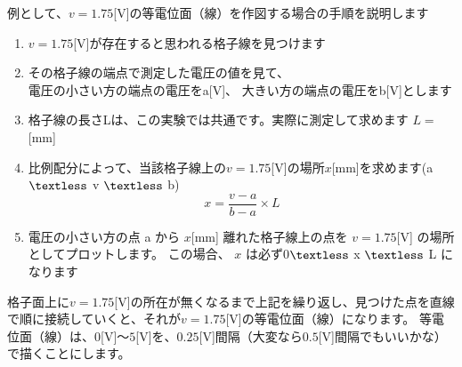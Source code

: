 \documentclass[uplatex,a4paper,11pt,oneside,openany]{jsbook}
\begin{document}
例として、$v=1.75$[V]の等電位面（線）を作図する場合の手順を説明します

\begin{enumerate}
  \item $v=1.75$[V]が存在すると思われる格子線を見つけます
  \item その格子線の端点で測定した電圧の値を見て、\\
  電圧の小さい方の端点の電圧をa[V]、
  大きい方の端点の電圧をb[V]とします
  \item 格子線の長さLは、この実験では共通です。実際に測定して求めます $L=$　　　[mm]
  \item 比例配分によって、当該格子線上の$v=1.75$[V]の場所$x$[mm]を求めます(a$\textless$ v $\textless$ b)
  \begin{equation*}x=\frac{v-a}{b-a}\times L\end{equation*}
  \item 電圧の小さい方の点 a から $x$[mm] 離れた格子線上の点を $v=1.75$[V] の場所としてプロットします。
  この場合、 $x$ は必ず0$\textless$ x $\textless$ L になります
\end{enumerate}

格子面上に$v=1.75$[V]の所在が無くなるまで上記を繰り返し、見つけた点を直線で順に接続していくと、それが$v=1.75$[V]の等電位面（線）になります。
等電位面（線）は、$0$[V]〜$5$[V]を、$0.25$[V]間隔（大変なら$0.5$[V]間隔でもいいかな）で描くことにします。
\end{document}
